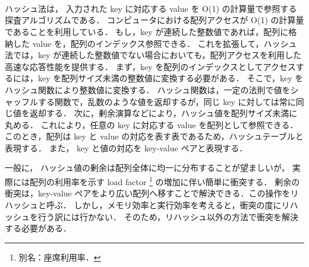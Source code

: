 \thispagestyle{empty} %

　\\
\\
\\
\\
\\
\\
\\
\\

ハッシュ法は，
入力された key に対応する value を O(1) の計算量で参照する探査アルゴリズムである．
コンピュータにおける配列アクセスが O(1) の計算量であることを利用している．
もし，key が連続した整数値であれば，配列に格納した value を，配列のインデックス参照できる．
これを拡張して，ハッシュ法では，key が連続した整数値でない場合においても，配列アクセスを利用した高速な応答性能を提供する．
まず，key を配列のインデックスとしてアクセスするには，key を配列サイズ未満の整数値に変換する必要がある．
そこで，key をハッシュ関数により整数値に変換する．
ハッシュ関数は，一定の法則で値をシャッフルする関数で，乱数のような値を返却するが，同じ key に対しては常に同じ値を返却する．
次に，剰余演算などにより，ハッシュ値を配列サイズ未満に丸める．
これにより，任意の key に対応する value を配列として参照できる．
このとき，配列は key と value の対応を表す表であるため，ハッシュテーブルと表現する．
また， key と値の対応を key-value ペアと表現する．

一般に，
ハッシュ値の剰余は配列全体に均一に分布することが望ましいが，
実際には配列の利用率を示す load factor \footnote{別名：座席利用率．} の増加に伴い簡単に衝突する．
剰余の衝突は，key-value ペアをより広い配列へ移すことで解決できる．この操作をリハッシュと呼ぶ．
しかし，メモリ効率と実行効率を考えると，衝突の度にリハッシュを行う訳には行かない．
そのため，リハッシュ以外の方法で衝突を解決する必要がある．

